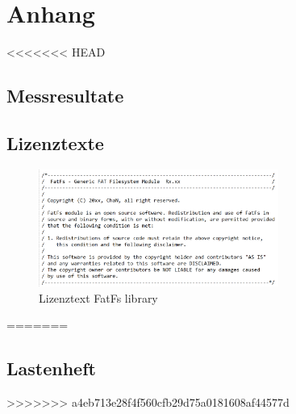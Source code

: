 \section{Anhang}\label{sec:anhang}

<<<<<<< HEAD
\subsection{Messresultate}\label{sec:messresultate}

\subsection{Lizenztexte}\label{sec:lizenztexte}

\begin{figure}[H]
	\begin{center}
		\includegraphics[width=0.7\textwidth]{data/Lizenztext_FatFs.png}
		\caption{Lizenztext FatFs library} %
		\label{fig:Lizentext FatFs}
	\end{center}
\end{figure}
=======
\newpage
\subsection{Lastenheft}\label{sec:lastenheft}

>>>>>>> a4eb713e28f4f560cfb29d75a0181608af44577d
